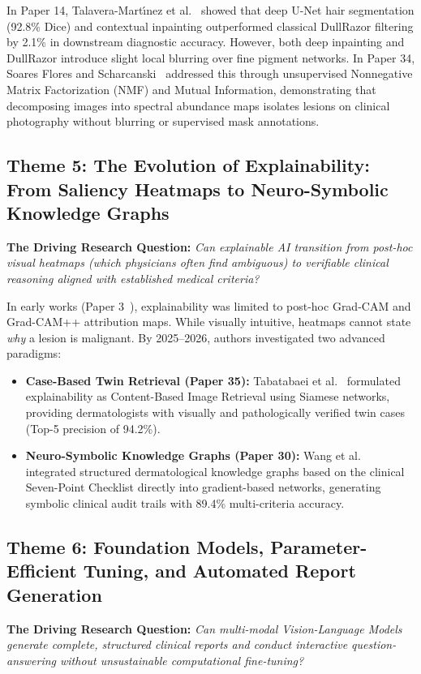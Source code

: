 In Paper 14, Talavera-Mart{\'\i}nez et al.~\cite{9306830} showed that deep U-Net hair segmentation (92.8\% Dice) and contextual inpainting outperformed classical DullRazor filtering by 2.1\% in downstream diagnostic accuracy. However, both deep inpainting and DullRazor introduce slight local blurring over fine pigment networks. In Paper 34, Soares Flores and Scharcanski~\cite{11058930} addressed this through unsupervised Nonnegative Matrix Factorization (NMF) and Mutual Information, demonstrating that decomposing images into spectral abundance maps isolates lesions on clinical photography without blurring or supervised mask annotations.

\subsection{Theme 5: The Evolution of Explainability: From Saliency Heatmaps to Neuro-Symbolic Knowledge Graphs}
\textbf{The Driving Research Question:} \textit{Can explainable AI transition from post-hoc visual heatmaps (which physicians often find ambiguous) to verifiable clinical reasoning aligned with established medical criteria?}

In early works (Paper 3~\cite{10107401}), explainability was limited to post-hoc Grad-CAM and Grad-CAM++ attribution maps. While visually intuitive, heatmaps cannot state \textit{why} a lesion is malignant. By 2025--2026, authors investigated two advanced paradigms:
\begin{itemize}[leftmargin=*]
    \item \textbf{Case-Based Twin Retrieval (Paper 35):} Tabatabaei et al.~\cite{11224374} formulated explainability as Content-Based Image Retrieval using Siamese networks, providing dermatologists with visually and pathologically verified twin cases (Top-5 precision of 94.2\%).
    \item \textbf{Neuro-Symbolic Knowledge Graphs (Paper 30):} Wang et al.~\cite{11151232} integrated structured dermatological knowledge graphs based on the clinical Seven-Point Checklist directly into gradient-based networks, generating symbolic clinical audit trails with 89.4\% multi-criteria accuracy.
\end{itemize}

\subsection{Theme 6: Foundation Models, Parameter-Efficient Tuning, and Automated Report Generation}
\textbf{The Driving Research Question:} \textit{Can multi-modal Vision-Language Models generate complete, structured clinical reports and conduct interactive question-answering without unsustainable computational fine-tuning?}


